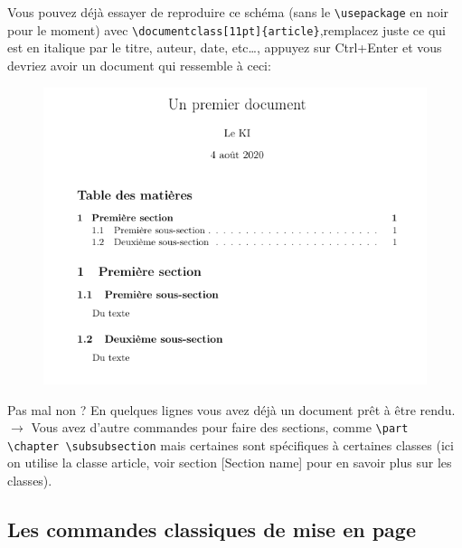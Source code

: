 \documentclass[11pt]{article}				%
\newcommand{\tb}{\textbackslash}
\begin{document}
Vous pouvez déjà essayer de reproduire ce schéma (sans le \texttt{\tb usepackage} en noir pour le moment) avec \texttt{\tb documentclass[11pt]\{article\}},remplacez juste ce qui est en italique par le titre, auteur, date, etc\dots, appuyez sur Ctrl+Enter et vous devriez avoir un document qui ressemble à ceci:
\begin{figure}[h!]
\begin{center}
	\includegraphics[scale=0.4]{ressources/frover.png}
\end{center}	

\end{figure}


Pas mal non ? En quelques lignes vous avez déjà un document prêt à être rendu.\\

$\rightarrow$ Vous avez d'autre commandes pour faire des sections, comme \texttt{\tb part  \tb chapter  \tb subsubsection} mais certaines sont spécifiques à certaines classes (ici on utilise la classe article, voir section [Section name] pour en savoir plus sur les classes).

\subsection{Les commandes classiques de mise en page}
\end{document}
